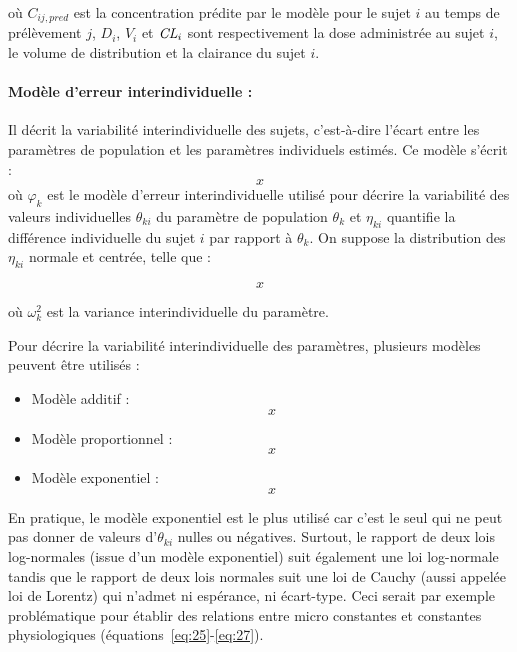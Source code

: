 où $C_{ij,pred}$ est la concentration prédite par le modèle pour le sujet $i$ au temps de prélèvement $j$, $D_i$, $V_i$ et $\operatorname{\textit{CL}}_i$ sont respectivement la dose administrée au sujet $i$, le volume de distribution et la clairance du sujet $i$.

\paragraph*{Modèle d'erreur interindividuelle :} Il décrit la variabilité interindividuelle des sujets, c'est-à-dire l'écart entre les paramètres de population et les paramètres individuels estimés. Ce modèle s'écrit :
\begin{equation}
x
\label{eq:38}
\end{equation}
où $\varphi_k$ est le modèle d'erreur interindividuelle utilisé pour décrire la variabilité des valeurs individuelles $\theta_{ki}$ du paramètre de population $\theta_k$ et  $\eta_{ki}$ quantifie la différence individuelle du sujet $i$ par rapport à $\theta_k$. On suppose la distribution des $\eta_{ki}$ normale et centrée, telle que :

\begin{equation}
x
\label{eq:39}
\end{equation}

où $\omega_k^2$ est la variance interindividuelle du paramètre.

Pour décrire la variabilité interindividuelle des paramètres, plusieurs modèles peuvent être utilisés :

\begin{itemize}
\item Modèle additif :
\begin{equation}
x
\label{eq:40}
\end{equation}

\item Modèle proportionnel :
\begin{equation}
x
\label{eq:41}
\end{equation}

\item Modèle exponentiel :
\begin{equation}
x
\label{eq:42}
\end{equation}
 
\end{itemize}

En pratique, le modèle exponentiel est le plus utilisé car c'est le seul qui ne peut pas donner de valeurs d'$\theta_{ki}$ nulles ou négatives. Surtout, le rapport de deux lois log-normales (issue d'un modèle exponentiel) suit également une loi log-normale tandis que le rapport de deux lois normales suit une loi de Cauchy (aussi appelée loi de Lorentz) qui n'admet ni espérance, ni écart-type. Ceci serait par exemple problématique pour établir des relations entre micro constantes et constantes physiologiques (équations~\ref{eq:25}-\ref{eq:27}). 

